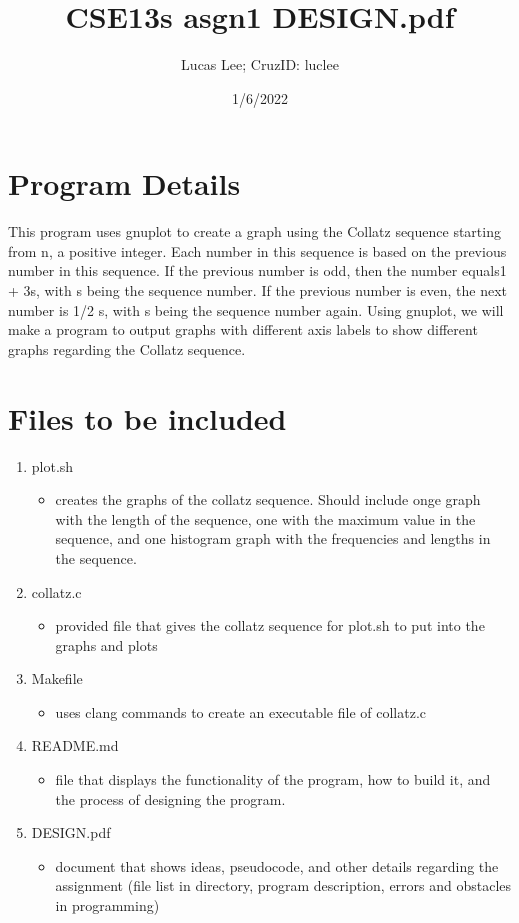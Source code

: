 \documentclass[11pt]{article}
\begin{document}
\title{CSE13s asgn1 DESIGN.pdf}
\author{Lucas Lee; CruzID: luclee}
\date {1/6/2022}
\maketitle
\section{Program Details}\label{ss:details}
This program uses gnuplot to create a graph using the Collatz sequence starting from n, a positive integer. Each number in this sequence is based on the previous number in this sequence. If the previous number is odd, then the number equals1 + 3s, with s being the sequence number. If the previous number is even, the next number is 1/2 s, with s being the sequence number again. Using gnuplot, we will make a program to output graphs with different axis labels to show different graphs regarding the Collatz sequence. 

\section{Files to be included}\label{ss:files}
\begin{enumerate}
	\item plot.sh
	\begin{itemize}
		\item creates the graphs of the collatz sequence. Should include onge graph with the length of the sequence, one with the maximum value in the sequence, and one histogram graph with the frequencies and lengths in the sequence.
	\end{itemize}
	\item collatz.c
	\begin{itemize}
		\item provided file that gives the collatz sequence for plot.sh to put into the graphs and plots
	\end{itemize}
	\item Makefile
	\begin{itemize}
		\item uses clang commands to create an executable file of collatz.c
	\end{itemize}
	\item README.md
	\begin{itemize}
		\item file that displays the functionality of the program, how to build it, and the process of designing the program.
	\end{itemize}
	\item DESIGN.pdf
	\begin{itemize}
		\item document that shows ideas, pseudocode, and other details regarding the assignment (file list in directory, program description, errors and obstacles in programming)
	\end{itemize}
\end{enumerate}
\end{document}
